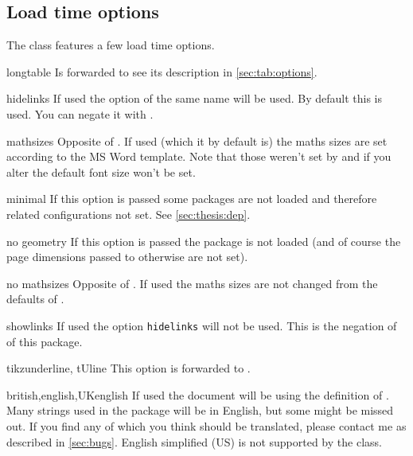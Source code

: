 \subsection{Load time options}\label{sec:thesis:opt}%
The class features a few load time options.
\begin{describeopt}{longtable}
  Is forwarded to  see its description in \autoref{sec:tab:options}.
\end{describeopt}
\begin{describeopt}{hidelinks}
  If used the  option of the same name will be used. By default
  this is used. You can negate it with .
\end{describeopt}
\begin{describeopt}{mathsizes}
  Opposite of . If used (which it by default is) the maths
  sizes are set according to the MS Word template. Note that those weren't set
  by  and if you alter the default font size won't be set.
\end{describeopt}
\begin{describeopt}{minimal}
  If this option is passed some packages are not loaded and therefore related
  configurations not set. See \autoref{sec:thesis:dep}.
\end{describeopt}
\begin{describeopt}{no geometry}
  If this option is passed the  package is not loaded (and of
  course the page dimensions passed to  otherwise are not set).
\end{describeopt}
\begin{describeopt}{no mathsizes}
  Opposite of . If used the maths sizes are not changed from the
  defaults of .
\end{describeopt}
\begin{describeopt}{showlinks}
  If used the  option \verb|hidelinks| will not be used. This is
  the negation of  of this package.
\end{describeopt}
\begin{describeopt}{tikzunderline, tUline}
  This option is forwarded to .
\end{describeopt}
\begin{describeopt}{british,english,UKenglish}
  If used the document will be using the  definition of
  . Many strings used in the package will be in English, but some
  might be missed out. If you find any of which you think should be translated,
  please contact me as described in \autoref{sec:bugs}. English simplified (US)
  is not supported by the class.
\end{describeopt}


